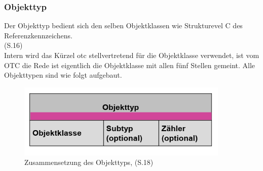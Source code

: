 \subsubsection{Objekttyp}
\label{sub:objektt}
Der Objekttyp bedient sich den selben Objektklassen wie Strukturevel C des Referenzkennzeichens.\\
 \cite{5}(S.16) \\
Intern wird das Kürzel \ac{otc} stellvertretend für die Objektklasse verwendet, ist vom OTC die Rede ist eigentlich die Objektklasse mit allen fünf Stellen gemeint.
Alle Objekttypen sind wie folgt aufgebaut.
\begin{figure}[H]
   \begin{center}
   \includegraphics[width=0.9\textwidth]{Bilder/objekttypaufbau} 
   \caption{Zusammensetzung des Objekttyps, \cite{5}(S.18)} 
   \label{fig:objekttypaufbau} 
   \end{center}
\end{figure}


